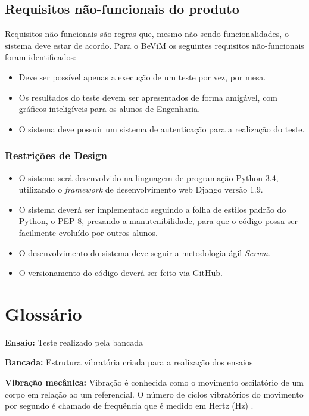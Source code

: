     \subsection*{Requisitos não-funcionais do produto}
    
    	Requisitos não-funcionais são regras que, mesmo não sendo funcionalidades, o sistema deve estar de acordo. Para o BeViM os seguintes requisitos não-funcionais foram identificados:
        
        \begin{itemize}
            \item Deve ser possível apenas a execução de um teste por vez, por mesa.
            \item Os resultados do teste devem ser apresentados de forma amigável, com gráficos inteligíveis para os alunos de Engenharia.
            \item O sistema deve possuir um sistema de autenticação para a realização do teste.

        \end{itemize}
        
        \subsubsection*{Restrições de Design}
        	
            \begin{itemize}
                \item O sistema será desenvolvido na linguagem de programação Python 3.4, utilizando o \textit{framework} de desenvolvimento web Django versão 1.9.
                \item O sistema deverá ser implementado seguindo a folha de estilos padrão do Python, o \href{https://www.python.org/dev/peps/pep-0008/}{PEP 8}, prezando a manutenibilidade, para que o código possa ser facilmente evoluído por outros alunos.
                \item O desenvolvimento do sistema deve seguir a metodologia ágil \textit{Scrum}.
                
                \item O versionamento do código deverá ser feito via GitHub.
            \end{itemize}
    
\section*{Glossário}
    
    \textbf{Ensaio:} Teste realizado pela bancada 
 
    \textbf{Bancada:} Estrutura vibratória criada para a realização dos ensaios 
    
    \textbf{Vibração mecânica:} Vibração é conhecida como o movimento oscilatório de um corpo em relação ao um referencial. O número de ciclos vibratórios do movimento por segundo é chamado de frequência que é medido em Hertz (Hz) \cite{inman}.
    
